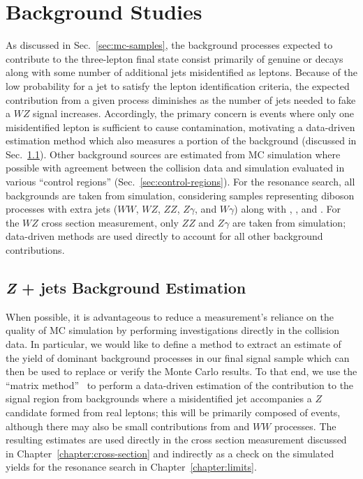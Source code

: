 \chapter{Background Studies}
\label{chapter:background}

As discussed in Sec.~\ref{sec:mc-samples}, the background processes expected to contribute to the three-lepton final state consist primarily of genuine \wtolnu{} or \ztoll{} decays along with some number of additional jets misidentified as leptons.  Because of the low probability for a jet to satisfy the lepton identification criteria, the expected contribution from a given process diminishes as the number of jets needed to fake a $WZ$ signal increases.  Accordingly, the primary concern is \Zjets{} events where only one misidentified lepton is sufficient to cause contamination, motivating a data-driven estimation method which also measures a portion of the \ttbar{} background (discussed in Sec.~\ref{sec:matrix-method}).  Other background sources are estimated from MC simulation where possible with agreement between the collision data and simulation evaluated in various ``control regions'' (Sec.~\ref{sec:control-regions}).  For the resonance search, all backgrounds are taken from simulation, considering samples representing diboson processes with extra jets ($WW$, $WZ$, $ZZ$, $Z\gamma$, and $W\gamma$) along with \Zjets, \Wjets, and \ttbar.  For the $WZ$ cross section measurement, only $ZZ$ and $Z\gamma$ are taken from simulation; data-driven methods are used directly to account for all other background contributions.

\section{\emph{Z} + jets Background Estimation}
\label{sec:matrix-method}

When possible, it is advantageous to reduce a measurement's reliance on the quality of MC simulation by performing investigations directly in the collision data.  In particular, we would like to define a method to extract an estimate of the yield of dominant background processes in our final signal sample which can then be used to replace or verify the Monte Carlo results.
To that end, we use the ``matrix method''~\cite{CMS-PAS-EWK-11-010} to perform a data-driven estimation of the contribution to the signal region from backgrounds where a misidentified jet accompanies a $Z$ candidate formed from real leptons; this will be primarily composed of \Zjets{} events, although there may also be small contributions from \ttbar{} and $WW$ processes.  The resulting estimates are used directly in the cross section measurement discussed in Chapter~\ref{chapter:cross-section} and indirectly as a check on the simulated yields for the resonance search in Chapter~\ref{chapter:limits}.


